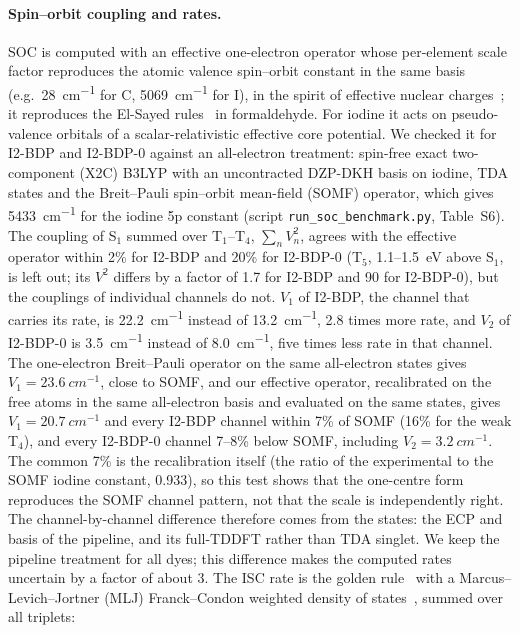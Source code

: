 \documentclass[journal=jctcce,manuscript=article]{achemso}
\begin{document}
\paragraph{Spin--orbit coupling and rates.} SOC is computed with an effective one-electron operator
whose per-element scale factor reproduces the atomic valence spin--orbit constant in the same basis
(e.g.\ \SI{28}{cm^{-1}} for C, \SI{5069}{cm^{-1}} for I), in the spirit of effective nuclear
charges~\cite{Koseki1992}; it reproduces the El-Sayed rules~\cite{ElSayed1963} in formaldehyde. For
iodine it acts on pseudo-valence orbitals of a scalar-relativistic effective core potential. We checked it for
I2-BDP and I2-BDP-0 against an all-electron treatment: spin-free exact two-component (X2C) B3LYP with an uncontracted DZP-DKH basis on
iodine, TDA states and the Breit--Pauli spin--orbit mean-field (SOMF) operator, which gives
\SI{5433}{cm^{-1}} for the iodine 5p constant (script \texttt{run\_soc\_benchmark.py}, Table~S6). The coupling of
S$_1$ summed over T$_1$--T$_4$, $\sum_n V_n^2$, agrees with the effective operator within 2\% for I2-BDP and
20\% for I2-BDP-0 (T$_5$, 1.1--1.5~eV above S$_1$, is left out; its $V^2$ differs by a factor of 1.7 for I2-BDP and 90 for I2-BDP-0), but the couplings
of individual channels do not. $V_1$ of I2-BDP, the channel that
carries its rate, is \SI{22.2}{cm^{-1}} instead of \SI{13.2}{cm^{-1}}, 2.8 times more rate, and $V_2$ of
I2-BDP-0 is \SI{3.5}{cm^{-1}} instead of \SI{8.0}{cm^{-1}}, five times less rate in that channel. The one-electron Breit--Pauli operator on the same all-electron states gives
$V_1=\SI{23.6}{cm^{-1}}$, close to SOMF, and our effective operator, recalibrated on the free atoms in the same
all-electron basis and evaluated on the same states, gives $V_1=\SI{20.7}{cm^{-1}}$ and every I2-BDP channel within
7\% of SOMF (16\% for the weak T$_4$), and every I2-BDP-0 channel 7--8\% below SOMF, including
$V_2=\SI{3.2}{cm^{-1}}$. The common 7\% is the recalibration itself (the ratio of the experimental to the SOMF iodine
constant, 0.933), so this test shows that the one-centre form reproduces the SOMF channel pattern, not that the
scale is independently right. The channel-by-channel difference therefore comes from the states: the ECP and
basis of the pipeline, and its full-TDDFT rather than TDA singlet. We keep the pipeline
treatment for all dyes; this difference makes the computed rates uncertain by a factor of about 3. The ISC
rate is the golden rule~\cite{Baryshnikov2017} with a Marcus--Levich--Jortner (MLJ) Franck--Condon weighted density of
states~\cite{Jortner1976}, summed over all triplets:
\end{document}
